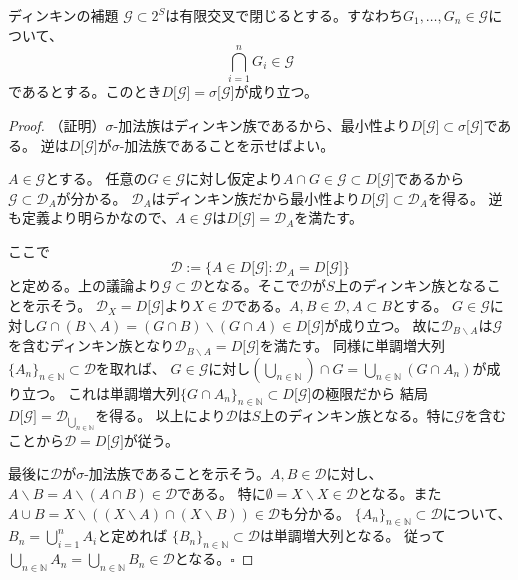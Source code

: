 \documentclass[../root.tex]{subfiles}
\begin{document}
\begin{Lem}{ディンキンの補題}{}
$ \mathscr{G}\subset 2^{S} $は有限交叉で閉じるとする。すなわち$ G_{1}, \dotsc, G_{n}\in\mathscr{G} $について、
\[ \bigcap_{i=1}^{n}G_{i}\in\mathscr{G} \]
であるとする。このとき$ D\lbrack \mathscr{G} \rbrack=\sigma\lbrack \mathscr{G} \rbrack $が成り立つ。
\end{Lem}

\begin{proof}
（証明）$ \sigma $-加法族はディンキン族であるから、最小性より$ D\lbrack \mathscr{G} \rbrack\subset\sigma\lbrack \mathscr{G} \rbrack $である。
逆は$ D\lbrack \mathscr{G} \rbrack $が$ \sigma $-加法族であることを示せばよい。

$ A\in\mathscr{G} $とする。
任意の$ G\in\mathscr{G} $に対し仮定より$ A\cap G\in\mathscr{G}\subset D\lbrack \mathscr{G} \rbrack $であるから$ \mathscr{G}\subset\mathscr{D}_{A} $が分かる。
$ \mathscr{D}_{A} $はディンキン族だから最小性より$ D\lbrack \mathscr{G} \rbrack\subset\mathscr{D}_{A} $を得る。
逆も定義より明らかなので、$ A\in\mathscr{G} $は$ D\lbrack \mathscr{G} \rbrack=\mathscr{D}_{A} $を満たす。

ここで
\[ \mathscr{D}:=\lbrace A\in D\lbrack \mathscr{G} \rbrack : \mathscr{D}_{A}=D\lbrack \mathscr{G} \rbrack \rbrace \]
と定める。上の議論より$ \mathscr{G}\subset\mathscr{D} $となる。そこで$ \mathscr{D} $が$ S $上のディンキン族となることを示そう。
$ \mathscr{D}_{X}=D\lbrack \mathscr{G} \rbrack $より$ X\in\mathscr{D} $である。$ A, B\in\mathscr{D}, A\subset B $とする。
$ G\in\mathscr{G} $に対し$ G\cap( B\backslash A )=( G\cap B )\backslash( G\cap A )\in D\lbrack \mathscr{G} \rbrack $が成り立つ。
故に$ \mathscr{D}_{B\backslash A} $は$ \mathscr{G} $を含むディンキン族となり$ \mathscr{D}_{B\backslash A}=D\lbrack \mathscr{G} \rbrack $を満たす。
同様に単調増大列$ \lbrace A_{n} \rbrace_{n\in\mathbb{N}}\subset\mathscr{D} $を取れば、
$ G\in\mathscr{G} $に対し$ ( \bigcup_{n\in\mathbb{N}} )\cap G=\bigcup_{n\in\mathbb{N}}( G\cap A_{n} ) $が成り立つ。
これは単調増大列$ \lbrace G\cap A_{n} \rbrace_{n\in\mathbb{N}}\subset D\lbrack \mathscr{G} \rbrack $の極限だから
結局$ D\lbrack \mathscr{G} \rbrack = \mathscr{D}_{\bigcup_{n\in\mathbb{N}}} $を得る。
以上により$ \mathscr{D} $は$ S $上のディンキン族となる。特に$ \mathscr{G} $を含むことから$ \mathscr{D}=D\lbrack \mathscr{G} \rbrack $が従う。

最後に$ \mathscr{D} $が$ \sigma $-加法族であることを示そう。$ A, B\in\mathscr{D} $に対し、$ A\backslash B=A\backslash( A\cap B )\in\mathscr{D} $である。
特に$ \emptyset=X\backslash X\in\mathscr{D} $となる。また$ A\cup B=X\backslash( ( X\backslash A )\cap( X\backslash B ) )\in\mathscr{D} $も分かる。
$ \lbrace A_{n} \rbrace_{n\in\mathbb{N}}\subset\mathscr{D} $について、$ B_{n}=\bigcup_{i=1}^{n}A_{i} $と定めれば
$ \lbrace B_{n} \rbrace_{n\in\mathbb{N}}\subset\mathscr{D} $は単調増大列となる。
従って$ \bigcup_{n\in\mathbb{N}}A_{n}=\bigcup_{n\in\mathbb{N}}B_{n}\in\mathscr{D} $となる。$ \square $
\end{proof}
\end{document}
